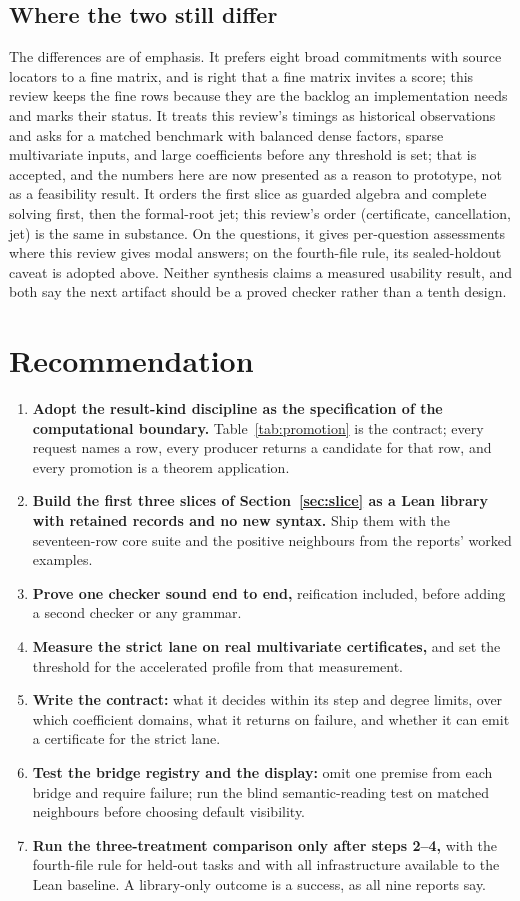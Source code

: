 \documentclass[11pt,a4paper]{article}
\newcommand{\code}[1]{\texttt{\detokenize{#1}}}
\theoremstyle{definition}
\begin{document}
\subsection{Where the two still differ}
The differences are of emphasis. It prefers eight broad commitments with source locators to a fine matrix, and is right that a fine matrix invites a score; this review keeps the fine rows because they are the backlog an implementation needs and marks their status. It treats this review's timings as historical observations and asks for a matched benchmark with balanced dense factors, sparse multivariate inputs, and large coefficients before any threshold is set; that is accepted, and the numbers here are now presented as a reason to prototype, not as a feasibility result. It orders the first slice as guarded algebra and complete solving first, then the formal-root jet; this review's order (certificate, cancellation, jet) is the same in substance. On the questions, it gives per-question assessments where this review gives modal answers; on the fourth-file rule, its sealed-holdout caveat is adopted above. Neither synthesis claims a measured usability result, and both say the next artifact should be a proved checker rather than a tenth design.

\section{Recommendation}\label{sec:recommendation}
\begin{enumerate}[label=\arabic*.]
\item \textbf{Adopt the result-kind discipline as the specification of the computational boundary.} Table~\ref{tab:promotion} is the contract; every request names a row, every producer returns a candidate for that row, and every promotion is a theorem application.
\item \textbf{Build the first three slices of Section~\ref{sec:slice} as a Lean library with retained records and no new syntax.} Ship them with the seventeen-row core suite and the positive neighbours from the reports' worked examples.
\item \textbf{Prove one checker sound end to end,} reification included, before adding a second checker or any grammar.
\item \textbf{Measure the strict lane on real multivariate certificates,} and set the threshold for the accelerated profile from that measurement.
\item \textbf{Write the \code{grobner} contract:} what it decides within its step and degree limits, over which coefficient domains, what it returns on failure, and whether it can emit a certificate for the strict lane.
\item \textbf{Test the bridge registry and the display:} omit one premise from each bridge and require failure; run the blind semantic-reading test on matched neighbours before choosing default visibility.
\item \textbf{Run the three-treatment comparison only after steps 2--4,} with the fourth-file rule for held-out tasks and with all infrastructure available to the Lean baseline. A library-only outcome is a success, as all nine reports say.
\end{enumerate}
\end{document}
